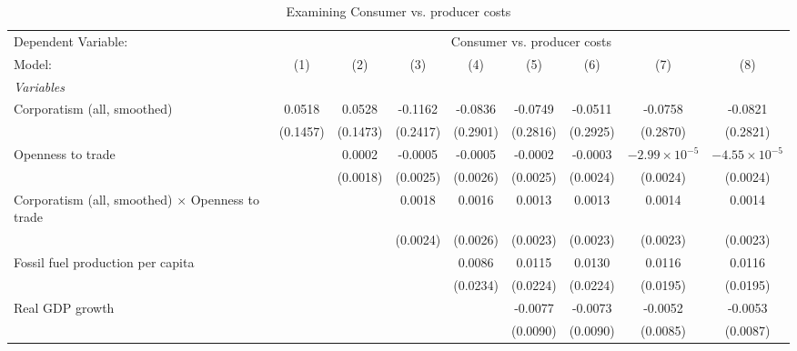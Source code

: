 
\begin{table}[htbp]
   \caption{Examining Consumer vs. producer costs}
   \centering
   \begin{tabular}{lcccccccc}
      \tabularnewline \midrule \midrule
      Dependent Variable: & \multicolumn{8}{c}{Consumer vs. producer costs}\\
      Model:                                                  & (1)      & (2)      & (3)      & (4)      & (5)      & (6)      & (7)                    & (8)\\  
      \midrule
      \emph{Variables}\\
      Corporatism (all, smoothed)                             & 0.0518   & 0.0528   & -0.1162  & -0.0836  & -0.0749  & -0.0511  & -0.0758                & -0.0821\\   
                                                              & (0.1457) & (0.1473) & (0.2417) & (0.2901) & (0.2816) & (0.2925) & (0.2870)               & (0.2821)\\   
      Openness to trade                                       &          & 0.0002   & -0.0005  & -0.0005  & -0.0002  & -0.0003  & $-2.99\times 10^{-5}$  & $-4.55\times 10^{-5}$\\    
                                                              &          & (0.0018) & (0.0025) & (0.0026) & (0.0025) & (0.0024) & (0.0024)               & (0.0024)\\   
      Corporatism (all, smoothed) $\times$ Openness to trade  &          &          & 0.0018   & 0.0016   & 0.0013   & 0.0013   & 0.0014                 & 0.0014\\   
                                                              &          &          & (0.0024) & (0.0026) & (0.0023) & (0.0023) & (0.0023)               & (0.0023)\\   
      Fossil fuel production per capita                       &          &          &          & 0.0086   & 0.0115   & 0.0130   & 0.0116                 & 0.0116\\   
                                                              &          &          &          & (0.0234) & (0.0224) & (0.0224) & (0.0195)               & (0.0195)\\   
      Real GDP growth                                         &          &          &          &          & -0.0077  & -0.0073  & -0.0052                & -0.0053\\   
                                                              &          &          &          &          & (0.0090) & (0.0090) & (0.0085)               & (0.0087)\\   

\end{tabular}
\end{table}
